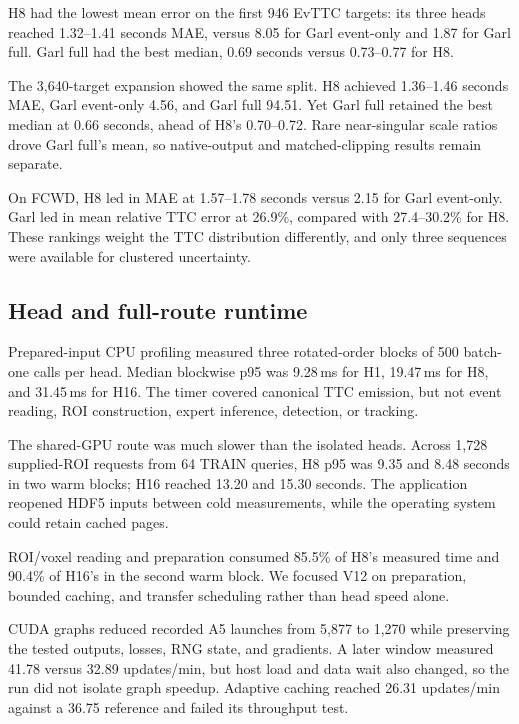 

H8 had the lowest mean error on the first 946 EvTTC targets: its three heads reached 1.32--1.41 seconds MAE, versus 8.05 for Garl event-only and 1.87 for Garl full. Garl full had the best median, 0.69 seconds versus 0.73--0.77 for H8. 

The 3,640-target expansion showed the same split. H8 achieved 1.36--1.46 seconds MAE, Garl event-only 4.56, and Garl full 94.51. Yet Garl full retained the best median at 0.66 seconds, ahead of H8's 0.70--0.72. Rare near-singular scale ratios drove Garl full's mean, so native-output and matched-clipping results remain separate. 

On FCWD, H8 led in MAE at 1.57--1.78 seconds versus 2.15 for Garl event-only. Garl led in mean relative TTC error at 26.9\%, compared with 27.4--30.2\% for H8. These rankings weight the TTC distribution differently, and only three sequences were available for clustered uncertainty. 

\subsection{Head and full-route runtime}



Prepared-input CPU profiling measured three rotated-order blocks of 500 batch-one calls per head. Median blockwise p95 was 9.28\,ms for H1, 19.47\,ms for H8, and 31.45\,ms for H16. The timer covered canonical TTC emission, but not event reading, ROI construction, expert inference, detection, or tracking. 

The shared-GPU route was much slower than the isolated heads. Across 1,728 supplied-ROI requests from 64 TRAIN queries, H8 p95 was 9.35 and 8.48 seconds in two warm blocks; H16 reached 13.20 and 15.30 seconds. The application reopened HDF5 inputs between cold measurements, while the operating system could retain cached pages. 

ROI/voxel reading and preparation consumed 85.5\% of H8's measured time and 90.4\% of H16's in the second warm block. We focused V12 on preparation, bounded caching, and transfer scheduling rather than head speed alone. 

CUDA graphs reduced recorded A5 launches from 5,877 to 1,270 while preserving the tested outputs, losses, RNG state, and gradients. A later window measured 41.78 versus 32.89 updates/min, but host load and data wait also changed, so the run did not isolate graph speedup. Adaptive caching reached 26.31 updates/min against a 36.75 reference and failed its throughput test. 
